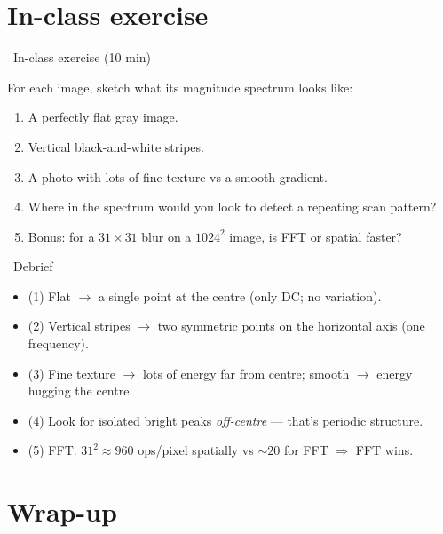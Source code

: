 \documentclass[10pt,aspectratio=169]{beamer}
\begin{document}
\section{In-class exercise}

\begin{frame}{\faPen~In-class exercise (10 min)}
  \begin{infobox}
  \end{infobox}
  For each image, sketch what its magnitude spectrum looks like:
  \begin{enumerate}
    \item A perfectly flat gray image.
    \item Vertical black-and-white stripes.
    \item A photo with lots of fine texture vs a smooth gradient.
    \item Where in the spectrum would you look to detect a repeating scan pattern?
    \item Bonus: for a $31\times31$ blur on a $1024^2$ image, is FFT or spatial faster?
  \end{enumerate}
\end{frame}

\begin{frame}{\faPen~Debrief}
  \begin{itemize}
    \item (1) Flat $\rightarrow$ a single point at the centre (only DC; no variation).
    \item (2) Vertical stripes $\rightarrow$ two symmetric points on the horizontal axis (one frequency).
    \item (3) Fine texture $\rightarrow$ lots of energy far from centre; smooth $\rightarrow$ energy hugging the centre.
    \item (4) Look for isolated bright peaks \emph{off-centre} — that's periodic structure.
    \item (5) FFT: $31^2\approx 960$ ops/pixel spatially vs $\sim 20$ for FFT $\Rightarrow$ FFT wins.
  \end{itemize}
\end{frame}

\section{Wrap-up}
\end{document}
